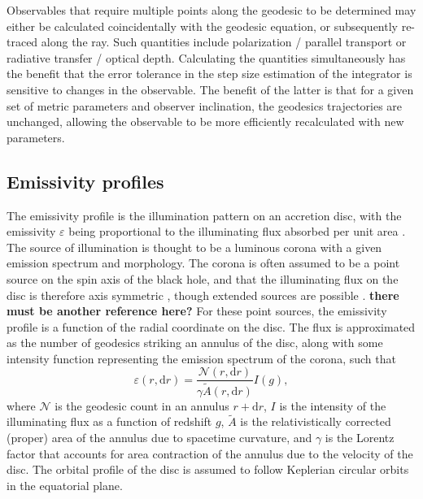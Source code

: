 \documentclass[fleqn,usenatbib]{mnras}
\newcommand{\todo}[1]{{\bf \color{red} #1}}
\renewcommand{\d}{\text{d}}
\begin{document}
Observables that require multiple points along the geodesic to be determined may either be calculated coincidentally with the geodesic equation, or subsequently re-traced along the ray. Such quantities include polarization / parallel transport or radiative transfer / optical depth. Calculating the quantities simultaneously has the benefit that the error tolerance in the step size estimation of the integrator is sensitive to changes in the observable. The benefit of the latter is that for a given set of metric parameters and observer inclination, the geodesics trajectories are unchanged, allowing the observable to be more efficiently recalculated with new parameters.


\subsection{Emissivity profiles}
\label{sec:emissivity-profiles}

The emissivity profile is the illumination pattern on an accretion disc, with the emissivity $\varepsilon$ being proportional to the illuminating flux absorbed per unit area \citep{laor_line_1991,wilkins_understanding_2012}. The source of illumination is thought to be a luminous corona with a given emission spectrum and morphology. The corona is often assumed to be a point source on the spin axis of the black hole, and that the illuminating flux on the disc is therefore axis symmetric \citep{fukumura_accretion_2007}, though extended sources are possible \citep{gonzalez_probing_2017}. \todo{there must be another reference here?} For these point sources, the emissivity profile is a function of the radial coordinate on the disc. The flux is approximated as the number of geodesics striking an annulus of the disc, along with some intensity function representing the emission spectrum of the corona, such that 
\begin{equation}
    \varepsilon (r, \d r) = \frac{\mathcal{N}(r, \d r)}{\gamma \tilde{A}(r, \d r)} I(g),
\end{equation}
where $\mathcal{N}$ is the geodesic count in an annulus $r + \d r$, $I$ is the intensity of the illuminating flux as a function of redshift $g$, $\tilde{A}$ is the relativistically corrected (proper) area of the annulus due to spacetime curvature, and $\gamma$ is the Lorentz factor that accounts for area contraction of the annulus due to the velocity of the disc. The orbital profile of the disc is assumed to follow Keplerian circular orbits in the equatorial plane.
\end{document}
